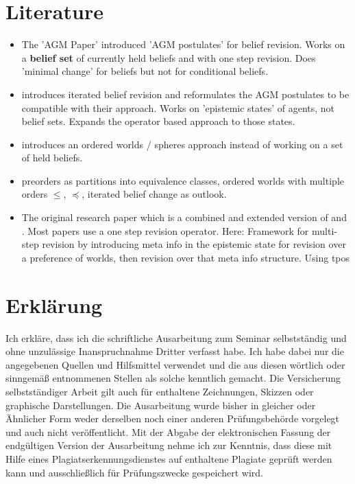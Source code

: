 \documentclass[11pt]{article}
\begin{document}
\section{Literature}
\begin{itemize}
    \item The 'AGM Paper' \cite{Alchourron1985} introduced 'AGM postulates' for belief revision. Works on a \textbf{belief set} of currently held beliefs and with one step revision. Does 'minimal change' for beliefs but not for conditional beliefs.
    \item \cite{Darwiche1997} introduces iterated belief revision and reformulates the AGM postulates to be compatible with their approach. Works on 'epistemic states' of agents, not belief sets. Expands the operator based approach to those states.
    \item \cite{Grove1988} introduces an ordered worlds / spheres approach instead of working on a set of held beliefs.
    \item \cite{Booth2004} preorders as partitions into equivalence classes, ordered worlds with multiple orders $\leq$, $\preceq$, iterated belief change as outlook.
    \item The original research paper \cite{Booth2011} which is a combined and extended version of \cite{Booth2006} and \cite{Booth2007}. Most papers use a one step revision operator. Here: Framework for multi-step revision by introducing meta info in the epistemic state for revision over a preference of worlds, then revision over that meta info structure. Using \gls{tpos}
\end{itemize}

\newpage

\printglossaries




\newpage

\section{Erklärung}
Ich erkläre, dass ich die schriftliche Ausarbeitung zum Seminar selbstständig und ohne unzulässige Inanspruchnahme Dritter verfasst habe. Ich habe dabei nur die angegebenen Quellen und Hilfsmittel verwendet und die aus diesen wörtlich oder sinngemäß entnommenen Stellen als solche kenntlich gemacht. Die Versicherung selbstständiger Arbeit gilt auch für enthaltene Zeichnungen, Skizzen oder graphische Darstellungen. Die Ausarbeitung wurde bisher in gleicher oder Ähnlicher Form weder derselben noch einer anderen Prüfungsbehörde vorgelegt und auch nicht veröffentlicht. Mit der Abgabe der elektronischen Fassung der endgültigen Version der Ausarbeitung nehme ich zur Kenntnis, dass diese mit Hilfe eines Plagiatserkennungsdienstes auf enthaltene Plagiate geprüft werden kann und ausschließlich für Prüfungszwecke gespeichert wird.
\end{document}

